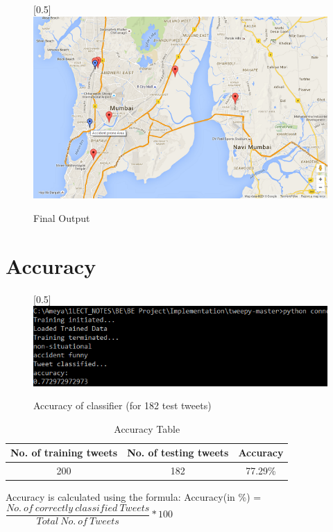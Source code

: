 \documentclass[journal]{IEEEtran}
\begin{document}
\begin{center}
	\begin{figure}[H]
		\scalebox{0.5}[0.5]{\includegraphics{FinalOutput}}
		\caption{Final Output}
		\label{FinalOutput}
	\end{figure}
\end{center}
\newpage
\section{Accuracy}
\begin{center}
	\begin{figure}[H]
		\scalebox{0.5}[0.5]{\includegraphics{accuracy}}
		\caption{Accuracy of classifier (for 182 test tweets)}
		\label{Accuracy}
	\end{figure}
\end{center}
\begin{table}[H]
	\caption{Accuracy Table}
	\label{Accuracy Table}
	\setlength{\tabcolsep}{3pt}
	\renewcommand{\arraystretch}{3}
	\begin{tabular}{|c|c|c|}
		\hline
		\textbf{No. of training tweets} & \textbf{No. of testing tweets} & \textbf{Accuracy}\\
		\hline
		200 & 182 & 77.29\% \\
		\hline
	\end{tabular}
\end{table}
Accuracy is calculated using the formula:\vspace{0.5cm}\newline
Accuracy(in \%) \newline= $\dfrac{No.\ of\ correctly\ classified\ Tweets}{Total\ No.\ of\ Tweets} * 100$
\end{document}
